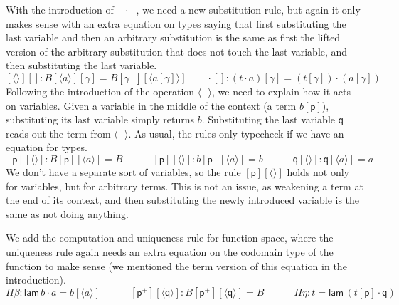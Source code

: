 \documentclass[submission,copyright,creativecommons]{eptcs}
\newcommand{\p}{\mathsf{p}}
\newcommand{\q}{\mathsf{q}}
\newcommand{\lam}{\mathsf{lam}}
\newcommand{\blank}{\mathord{\hspace{1pt}\text{--}\hspace{1pt}}} %
\begin{document}
With the introduction of $\blank\cdot\blank$, we need a new
substitution rule, but again it only makes sense with an extra
equation on types saying that first substituting the last variable and
then an arbitrary substitution is the same as first the lifted version
of the arbitrary substitution that does not touch the last variable,
and then substituting the last variable.
\[
[\langle\rangle][] : B[\langle a\rangle][\gamma] = B[\gamma^+][\langle a[\gamma]\rangle] \hspace{2em}
{\cdot}[] : (t\cdot a)[\gamma] = (t[\gamma])\cdot(a[\gamma])
\]
Following the introduction of the operation $\langle\blank\rangle$, we
need to explain how it acts on variables. Given a variable in the
middle of the context (a term $b[\p]$), substituting its last variable
simply returns $b$. Substituting the last variable $\q$ reads out the
term from $\langle\blank\rangle$. As usual, the rules only typecheck
if we have an equation for types.
\[
[\p][\langle\rangle] : B[\p][\langle a\rangle] = B \hspace{3em}
[\p][\langle\rangle] : b[\p ][\langle a\rangle] = b \hspace{3em}
\q[\langle\rangle] : \q[\langle a\rangle] = a
\]
We don't have a separate sort of variables, so the rule
$[\p][\langle\rangle]$ holds not only for variables, but for arbitrary
terms. This is not an issue, as weakening a term at the end of its
context, and then substituting the newly introduced variable is the
same as not doing anything.

We add the computation and uniqueness rule for function space, where
the uniqueness rule again needs an extra equation on the codomain type
of the function to make sense (we mentioned the term version of this equation in the introduction).
\[
\Pi\beta : \lam\,b\cdot a = b[\langle a\rangle] \hspace{3em}
[\p^+][\langle\q\rangle] : B[\p^+][\langle\q\rangle] = B \hspace{3em}
\Pi\eta : t = \lam\,(t[\p]\cdot\q)
\]
\end{document}
